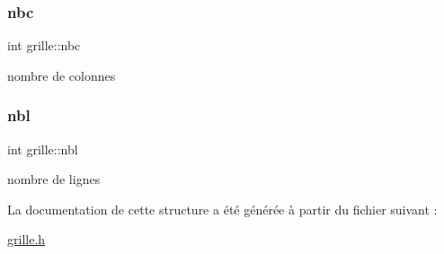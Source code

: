 \subsubsection{\texorpdfstring{nbc}{nbc}}
{\footnotesize\ttfamily int grille\+::nbc}

nombre de colonnes \mbox{\label{structgrille_a0b4da1e205825df205b0c004d105d62a}} 
\subsubsection{\texorpdfstring{nbl}{nbl}}
{\footnotesize\ttfamily int grille\+::nbl}

nombre de lignes 

La documentation de cette structure a été générée à partir du fichier suivant \+:\begin{DoxyCompactItemize}
\item 
\hyperlink{grille_8h}{grille.\+h}\end{DoxyCompactItemize}

